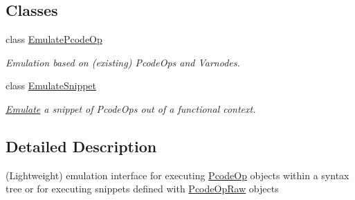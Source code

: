 \subsection*{Classes}
\begin{DoxyCompactItemize}
\item 
class \mbox{\hyperlink{class_emulate_pcode_op}{Emulate\+Pcode\+Op}}
\begin{DoxyCompactList}\small\item\em Emulation based on (existing) Pcode\+Ops and Varnodes. \end{DoxyCompactList}\item 
class \mbox{\hyperlink{class_emulate_snippet}{Emulate\+Snippet}}
\begin{DoxyCompactList}\small\item\em \mbox{\hyperlink{class_emulate}{Emulate}} a {\itshape snippet} of Pcode\+Ops out of a functional context. \end{DoxyCompactList}\end{DoxyCompactItemize}


\subsection{Detailed Description}
(Lightweight) emulation interface for executing \mbox{\hyperlink{class_pcode_op}{Pcode\+Op}} objects within a syntax tree or for executing snippets defined with \mbox{\hyperlink{class_pcode_op_raw}{Pcode\+Op\+Raw}} objects 


